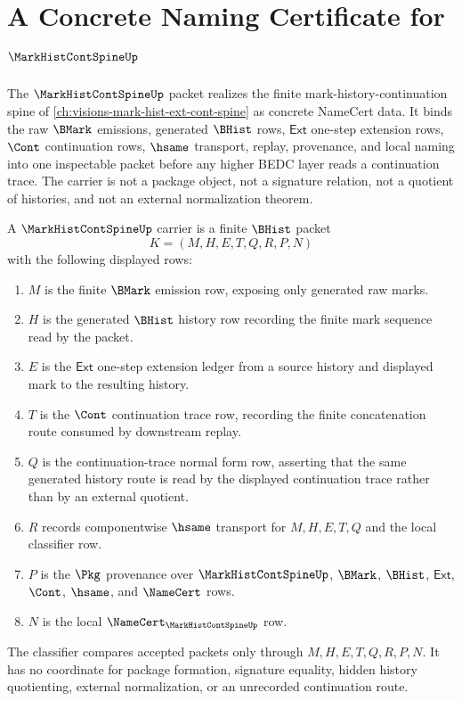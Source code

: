 \chapter{A Concrete Naming Certificate for $\MarkHistContSpineUp$}
\label{ch:concrete-instances-mark-hist-cont-spine-namecert}

The $\MarkHistContSpineUp$ packet realizes the finite mark-history-continuation spine of \autoref{ch:visions-mark-hist-ext-cont-spine} as concrete NameCert data. It binds the raw $\BMark$ emissions, generated $\BHist$ rows, $\mathsf{Ext}$ one-step extension rows, $\Cont$ continuation rows, $\hsame$ transport, replay, provenance, and local naming into one inspectable packet before any higher BEDC layer reads a continuation trace. The carrier is not a package object, not a signature relation, not a quotient of histories, and not an external normalization theorem.

\begin{definition}
\label{def:mark-hist-cont-spine-carrier}
A $\MarkHistContSpineUp$ carrier is a finite $\BHist$ packet
$$
K=(M,H,E,T,Q,R,P,N)
$$
with the following displayed rows:
\begin{enumerate}
\item $M$ is the finite $\BMark$ emission row, exposing only generated raw marks.
\item $H$ is the generated $\BHist$ history row recording the finite mark sequence read by the packet.
\item $E$ is the $\mathsf{Ext}$ one-step extension ledger from a source history and displayed mark to the resulting history.
\item $T$ is the $\Cont$ continuation trace row, recording the finite concatenation route consumed by downstream replay.
\item $Q$ is the continuation-trace normal form row, asserting that the same generated history route is read by the displayed continuation trace rather than by an external quotient.
\item $R$ records componentwise $\hsame$ transport for $M,H,E,T,Q$ and the local classifier row.
\item $P$ is the $\Pkg$ provenance over $\MarkHistContSpineUp$, $\BMark$, $\BHist$, $\mathsf{Ext}$, $\Cont$, $\hsame$, and $\NameCert$ rows.
\item $N$ is the local $\NameCert_{\MarkHistContSpineUp}$ row.
\end{enumerate}
The classifier compares accepted packets only through $M,H,E,T,Q,R,P,N$. It has no coordinate for package formation, signature equality, hidden history quotienting, external normalization, or an unrecorded continuation route.
\end{definition}

